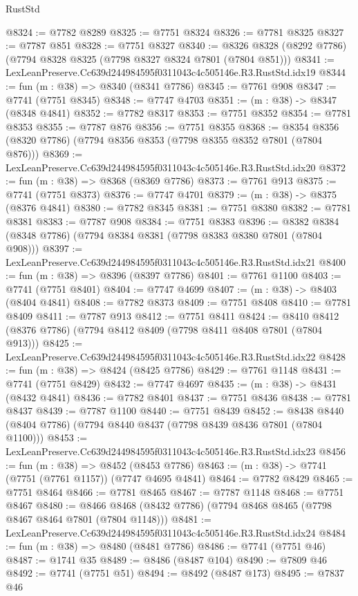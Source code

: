 \begin{lexlean}{RustStd}
\begin{coremodule}
@8324 := @7782 @8289
@8325 := @7751 @8324
@8326 := @7781 @8325
@8327 := @7787 @851
@8328 := @7751 @8327
@8340 := @8326 @8328 (@8292 @7786) (@7794 @8328 @8325 (@7798 @8327 @8324 @7801 (@7804 @851)))
@8341 := LexLeanPreserve.Cc639d244984595f0311043c4c505146e.R3.RustStd.idx19
@8344 := fun (m : @38) => @8340 (@8341 @7786)
@8345 := @7761 @908
@8347 := @7741 (@7751 @8345)
@8348 := @7747 @4703
@8351 := (m : @38) -> @8347 (@8348 @4841)
@8352 := @7782 @8317
@8353 := @7751 @8352
@8354 := @7781 @8353
@8355 := @7787 @876
@8356 := @7751 @8355
@8368 := @8354 @8356 (@8320 @7786) (@7794 @8356 @8353 (@7798 @8355 @8352 @7801 (@7804 @876)))
@8369 := LexLeanPreserve.Cc639d244984595f0311043c4c505146e.R3.RustStd.idx20
@8372 := fun (m : @38) => @8368 (@8369 @7786)
@8373 := @7761 @913
@8375 := @7741 (@7751 @8373)
@8376 := @7747 @4701
@8379 := (m : @38) -> @8375 (@8376 @4841)
@8380 := @7782 @8345
@8381 := @7751 @8380
@8382 := @7781 @8381
@8383 := @7787 @908
@8384 := @7751 @8383
@8396 := @8382 @8384 (@8348 @7786) (@7794 @8384 @8381 (@7798 @8383 @8380 @7801 (@7804 @908)))
@8397 := LexLeanPreserve.Cc639d244984595f0311043c4c505146e.R3.RustStd.idx21
@8400 := fun (m : @38) => @8396 (@8397 @7786)
@8401 := @7761 @1100
@8403 := @7741 (@7751 @8401)
@8404 := @7747 @4699
@8407 := (m : @38) -> @8403 (@8404 @4841)
@8408 := @7782 @8373
@8409 := @7751 @8408
@8410 := @7781 @8409
@8411 := @7787 @913
@8412 := @7751 @8411
@8424 := @8410 @8412 (@8376 @7786) (@7794 @8412 @8409 (@7798 @8411 @8408 @7801 (@7804 @913)))
@8425 := LexLeanPreserve.Cc639d244984595f0311043c4c505146e.R3.RustStd.idx22
@8428 := fun (m : @38) => @8424 (@8425 @7786)
@8429 := @7761 @1148
@8431 := @7741 (@7751 @8429)
@8432 := @7747 @4697
@8435 := (m : @38) -> @8431 (@8432 @4841)
@8436 := @7782 @8401
@8437 := @7751 @8436
@8438 := @7781 @8437
@8439 := @7787 @1100
@8440 := @7751 @8439
@8452 := @8438 @8440 (@8404 @7786) (@7794 @8440 @8437 (@7798 @8439 @8436 @7801 (@7804 @1100)))
@8453 := LexLeanPreserve.Cc639d244984595f0311043c4c505146e.R3.RustStd.idx23
@8456 := fun (m : @38) => @8452 (@8453 @7786)
@8463 := (m : @38) -> @7741 (@7751 (@7761 @1157)) (@7747 @4695 @4841)
@8464 := @7782 @8429
@8465 := @7751 @8464
@8466 := @7781 @8465
@8467 := @7787 @1148
@8468 := @7751 @8467
@8480 := @8466 @8468 (@8432 @7786) (@7794 @8468 @8465 (@7798 @8467 @8464 @7801 (@7804 @1148)))
@8481 := LexLeanPreserve.Cc639d244984595f0311043c4c505146e.R3.RustStd.idx24
@8484 := fun (m : @38) => @8480 (@8481 @7786)
@8486 := @7741 (@7751 @46)
@8487 := @1741 @35
@8489 := @8486 (@8487 @104)
@8490 := @7809 @46
@8492 := @7741 (@7751 @51)
@8494 := @8492 (@8487 @173)
@8495 := @7837 @46

\end{coremodule}
\end{lexlean}
